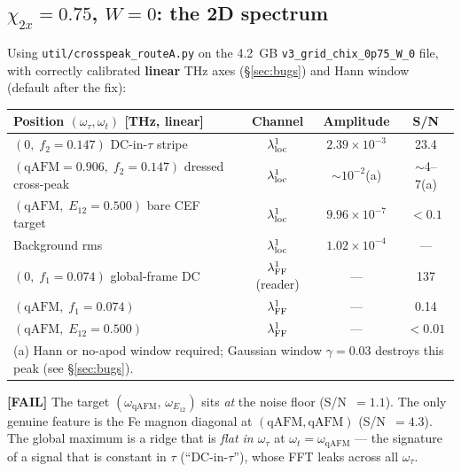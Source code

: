 \documentclass[11pt,a4paper]{article}
\newcommand{\qAFM}{\mathrm{qAFM}}
\newcommand{\EtA}{E_{12}}
\newcommand{\chitwox}{\chi_{2x}}
\newcommand{\crossP}{(\omega_{\qAFM},\,\omega_{\EtA})}
\newcommand{\FAIL}{\textcolor{failred}{\textbf{[FAIL]}}}
\begin{document}
\subsection{$\chitwox=0.75$, $W=0$: the 2D spectrum}\label{sec:chi2x075}
Using \texttt{util/crosspeak\_routeA.py} on the 4.2~GB
\texttt{v3\_grid\_chix\_0p75\_W\_0} file, with correctly
calibrated \textbf{linear} THz axes (\S\ref{sec:bugs}) and
Hann window (default after the fix):

\begin{center}
\begin{tabular}{lccc}
\toprule
Position $(\omega_\tau,\omega_t)$ [THz, linear] & Channel & Amplitude & S/N \\
\midrule
$(0,\; f_2=0.147)$ DC-in-$\tau$ stripe & $\lambda^1_{\rm loc}$ & $2.39\times10^{-3}$ & 23.4 \\
$(\qAFM=0.906,\;f_2=0.147)$ dressed cross-peak & $\lambda^1_{\rm loc}$ & $\sim 10^{-2}$(a) & $\sim$4--7(a) \\
$(\qAFM,\;\EtA=0.500)$ bare CEF target & $\lambda^1_{\rm loc}$ & $9.96\times10^{-7}$ & $<0.1$ \\
Background rms & $\lambda^1_{\rm loc}$ & $1.02\times10^{-4}$ & --- \\
\midrule
$(0,\; f_1=0.074)$ global-frame DC & $\lambda^1_{\rm FF}$ (reader) & --- & 137 \\
$(\qAFM,\; f_1=0.074)$ & $\lambda^1_{\rm FF}$ & --- & 0.14 \\
$(\qAFM,\;\EtA=0.500)$ & $\lambda^1_{\rm FF}$ & --- & $<0.01$ \\
\bottomrule
\multicolumn{4}{l}{\small (a) Hann or no-apod window required; Gaussian window
$\gamma=0.03$ destroys this peak (see \S\ref{sec:bugs}).}
\end{tabular}
\end{center}

\noindent\FAIL{} The target $\crossP$ sits \emph{at} the noise floor
(S/N~$=1.1$). The only genuine feature is the Fe magnon diagonal at
$(\qAFM,\qAFM)$ (S/N~$=4.3$). The global maximum is a ridge that is
\emph{flat in $\omega_\tau$} at $\omega_t=\omega_{\qAFM}$ --- the signature of a
signal that is constant in $\tau$ (``DC-in-$\tau$''), whose FFT leaks across all
$\omega_\tau$.
\end{document}
